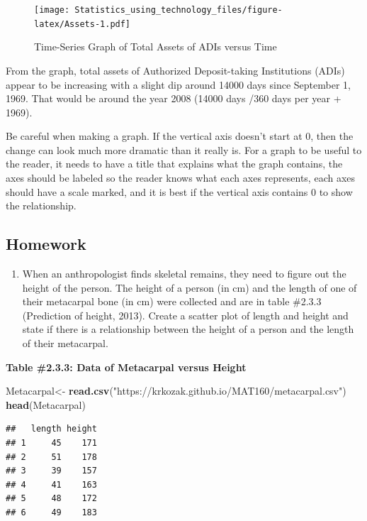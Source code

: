 \documentclass[]{book}
\newenvironment{Shaded}{\begin{snugshade}}{\end{snugshade}}
\newcommand{\KeywordTok}[1]{\textcolor[rgb]{0.13,0.29,0.53}{\textbf{#1}}}
\newcommand{\NormalTok}[1]{#1}
\newcommand{\StringTok}[1]{\textcolor[rgb]{0.31,0.60,0.02}{#1}}
\providecommand{\tightlist}{%
  \setlength{\itemsep}{0pt}\setlength{\parskip}{0pt}}
\begin{document}
\begin{figure}
\centering
\texttt{[image: Statistics\_using\_technology\_files/figure-latex/Assets-1.pdf]}
\caption{\label{fig:Assets}Time-Series Graph of Total Assets of ADIs versus Time}
\end{figure}

From the graph, total assets of Authorized Deposit-taking Institutions (ADIs) appear to be increasing with a slight dip around 14000 days since September 1, 1969. That would be around the year 2008 (14000 days /360 days per year + 1969).

Be careful when making a graph. If the vertical axis doesn't start at 0, then the change can look much more dramatic than it really is. For a graph to be useful to the reader, it needs to have a title that explains what the graph contains, the axes should be labeled so the reader knows what each axes represents, each axes should have a scale marked, and it is best if the vertical axis contains 0 to show the relationship.

\hypertarget{homework-6}{%
\subsection{Homework}\label{homework-6}}

\begin{enumerate}
\def\labelenumi{\arabic{enumi}.}
\tightlist
\item
  When an anthropologist finds skeletal remains, they need to figure out the height of the person. The height of a person (in cm) and the length of one of their metacarpal bone (in cm) were collected and are in table \#2.3.3 (Prediction of height, 2013). Create a scatter plot of length and height and state if there is a relationship between the height of a person and the length of their metacarpal.
\end{enumerate}

\textbf{Table \#2.3.3: Data of Metacarpal versus Height}

\begin{Shaded}
\begin{Highlighting}[]
\NormalTok{Metacarpal<-}\StringTok{ }\KeywordTok{read.csv}\NormalTok{(}\StringTok{"https://krkozak.github.io/MAT160/metacarpal.csv"}\NormalTok{) }
\KeywordTok{head}\NormalTok{(Metacarpal)}
\end{Highlighting}
\end{Shaded}

\begin{verbatim}
##   length height
## 1     45    171
## 2     51    178
## 3     39    157
## 4     41    163
## 5     48    172
## 6     49    183
\end{verbatim}
\end{document}
